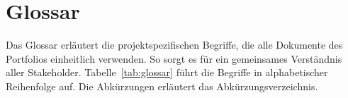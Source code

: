\section{Glossar}\label{sec:glossar}
Das Glossar erläutert die projektspezifischen Begriffe, die alle Dokumente des Portfolios einheitlich verwenden. So sorgt es für ein gemeinsames Verständnis aller Stakeholder. Tabelle~\ref{tab:glossar} führt die Begriffe in alphabetischer Reihenfolge auf. Die Abkürzungen erläutert das Abkürzungsverzeichnis.

